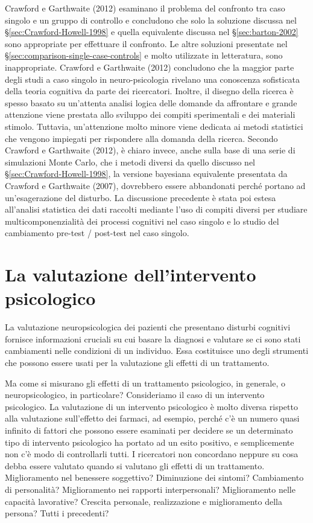 \documentclass[
  11pt,
]{krantz}
\theoremstyle{definition}
\theoremstyle{definition}
\theoremstyle{definition}
\theoremstyle{definition}
\theoremstyle{remark}
\begin{document}
Crawford e Garthwaite (2012) esaminano il problema del confronto tra caso singolo e un gruppo di controllo e concludono che solo la soluzione discussa nel \S \ref{sec:Crawford-Howell-1998} e quella equivalente discussa nel \S\ref{sec:barton-2002} sono appropriate per effettuare il confronto. Le altre soluzioni presentate nel \S \ref{sec:comparison-single-case-controls} e molto utilizzate in letteratura, sono inappropriate. Crawford e Garthwaite (2012) concludono che la maggior parte degli studi a caso singolo in neuro-psicologia rivelano una conoscenza sofisticata della teoria cognitiva da parte dei ricercatori. Inoltre, il disegno della ricerca è spesso basato su un'attenta analisi logica delle domande da affrontare e grande attenzione viene prestata allo sviluppo dei compiti sperimentali e dei materiali stimolo. Tuttavia, un'attenzione molto minore viene dedicata ai metodi statistici che vengono impiegati per rispondere alla domanda della ricerca. Secondo Crawford e Garthwaite (2012), è chiaro invece, anche sulla base di una serie di simulazioni Monte Carlo, che i metodi diversi da quello discusso nel \S\ref{sec:Crawford-Howell-1998}, la versione bayesiana equivalente presentata da Crawford e Garthwaite (2007), dovrebbero essere abbandonati perché portano ad un'esagerazione del disturbo. La discussione precedente è stata poi estesa all'analisi statistica dei dati raccolti mediante l'uso di compiti diversi per studiare multicomponenzialità dei processi cognitivi nel caso singolo e lo studio del cambiamento pre-test / post-test nel caso singolo.

\hypertarget{ch:effectiveness}{%
\chapter{La valutazione dell'intervento psicologico}\label{ch:effectiveness}}

La valutazione neuropsicologica dei pazienti che presentano disturbi cognitivi fornisce informazioni cruciali su cui basare la diagnosi e valutare se ci sono stati cambiamenti nelle condizioni di un individuo. Essa costituisce uno degli strumenti che possono essere usati per la valutazione gli effetti di un trattamento.

Ma come si misurano gli effetti di un trattamento psicologico, in generale, o neuropsicologico, in particolare? Consideriamo il caso di un intervento psicologico. La valutazione di un intervento psicologico è molto diversa rispetto alla valutazione sull'effetto dei farmaci, ad esempio, perché c'è un numero quasi infinito di fattori che possono essere esaminati per decidere se un determinato tipo di intervento psicologico ha portato ad un esito positivo, e semplicemente non c'è modo di controllarli tutti. I ricercatori non concordano neppure su cosa debba essere valutato quando si valutano gli effetti di un trattamento. Miglioramento nel benessere soggettivo? Diminuzione dei sintomi? Cambiamento di personalità? Miglioramento nei rapporti interpersonali? Miglioramento nelle capacità lavorative? Crescita personale, realizzazione e miglioramento della persona? Tutti i precedenti?
\end{document}
